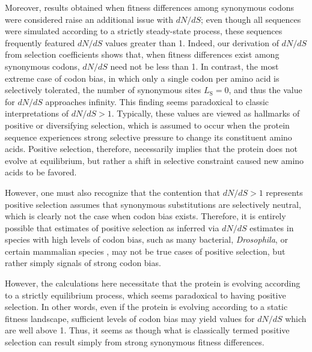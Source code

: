 \documentclass[11pt]{article}
\begin{document}
Moreover, results obtained when fitness differences among synonymous codons were considered raise an additional issue with $dN/dS$; even though all sequences were simulated according to a strictly steady-state process, these sequences frequently featured $dN/dS$ values greater than 1. Indeed, our derivation of $dN/dS$ from selection coefficients shows that, when fitness differences exist among synonymous codons, $dN/dS$ need not be less than 1. In contrast, the most extreme case of codon bias, in which only a single codon per amino acid is selectively tolerated, the number of synonymous sites $L_\text{S} = 0$, and thus the value for $dN/dS$ approaches infinity. This finding seems paradoxical to classic interpretations of $dN/dS >1$. Typically, these values are viewed as hallmarks of positive or diversifying selection, which is assumed to occur when the protein sequence experiences strong selective pressure to change its constituent amino acids. Positive selection, therefore, necessarily implies that the protein does not evolve at equilibrium, but rather a shift in selective constraint caused new amino acids to be favored. 


However, one must also recognize that the contention that $dN/dS > 1$ represents positive selection assumes that synonymous substitutions are selectively neutral, which is clearly not the case when codon bias exists. Therefore, it is entirely possible that estimates of positive selection as inferred via $dN/dS$ estimates in species with high levels of codon bias, such as many bacterial, \textit{Drosophila}, or certain mammalian species \cite{Duret2002, Chamaryetal2006, HershbergPetrov2008, PlotkinKudla2010}, may not be true cases of positive selection, but rather simply signals of strong codon bias.


However, the calculations here necessitate that the protein is evolving according to a strictly equilibrium process, which seems paradoxical to having positive selection. In other words, even if the protein is evolving according to a static fitness landscape, sufficient levels of codon bias may yield values for $dN/dS$ which are well above 1. Thus, it seems as though what is classically termed positive selection can result simply from strong synonymous fitness differences.
 





\clearpage
\newpage

	

\clearpage
\newpage
\end{document}
